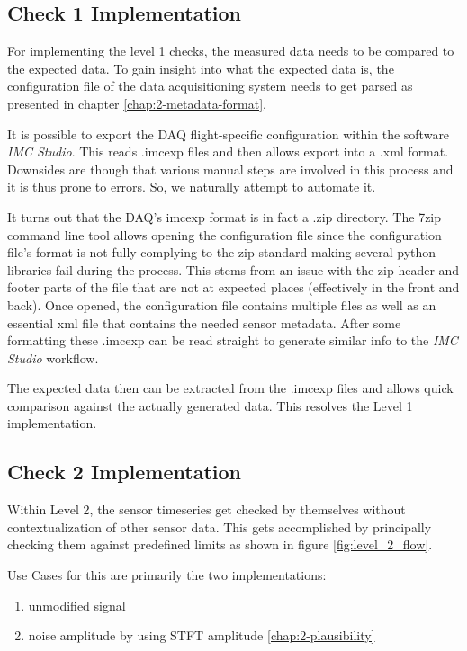 \subsection{Check 1 Implementation}
For implementing the level 1 checks, the measured data needs to be compared to the expected data. To gain insight into what the expected data is, the configuration file of the data acquisitioning system needs to get parsed as presented in chapter \ref{chap:2-metadata-format}.

It is possible to export the DAQ flight-specific configuration within the software \textit{IMC Studio}. This reads .imcexp files and then allows export into a .xml format. Downsides are though that various manual steps are involved in this process and it is thus prone to errors. So, we naturally attempt to automate it.

It turns out that the DAQ's imcexp format is in fact a .zip directory. The 7zip command line tool allows opening the configuration file since the configuration file's format is not fully complying to the zip standard making several python libraries fail during the process. This stems from an issue with the zip header and footer parts of the file that are not at expected places (effectively in the front and back). Once opened, the configuration file contains multiple files as well as an essential xml file that contains the needed sensor metadata. After some formatting these .imcexp can be read straight to generate similar info to the \textit{IMC Studio} workflow.

The expected data then can be extracted from the .imcexp files and allows quick comparison against the actually generated data. This resolves the Level 1 implementation.

\subsection{Check 2 Implementation}

Within Level 2, the sensor timeseries get checked by themselves without contextualization of other sensor data. This gets accomplished by principally checking them against predefined limits as shown in figure \ref{fig:level_2_flow}.

Use Cases for this are primarily the two implementations:

\begin{enumerate}
    \item unmodified signal
    \item noise amplitude by using STFT amplitude \ref{chap:2-plausibility}
\end{enumerate}

